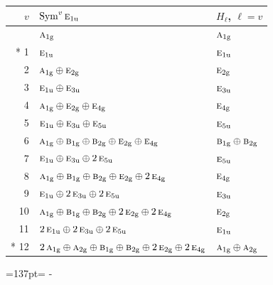\documentclass[10pt,a4paper]{article}
\newcommand{\needspace}[1]{\par\penalty-100\begingroup\dimen0=#1\relax\dimen2=\pagegoal
  \advance\dimen2-\pagetotal\ifdim\dimen0>\dimen2\relax\ifdim\dimen2>0pt\vfil\break\fi\fi
  \endgroup}
\numberwithin{equation}{section}
\newcommand{\irr}[1]{\text{\normalfont\scshape #1}}
\newcommand{\ptag}[1]{\mathrm{#1}}
\begin{document}
{\small\begin{longtable}{@{}rll@{}}\toprule
$v$ & $\operatorname{Sym}^{v}\irr{e}_{1\ptag{u}}$ & $H_\ell$, $\ell = v$\\\midrule\endhead
\bottomrule\endfoot\endlastfoot
0 & $\irr{a}_{1\ptag{g}}$ & $\irr{a}_{1\ptag{g}}$\\*
1 & $\irr{e}_{1\ptag{u}}$ & $\irr{e}_{1\ptag{u}}$\\
2 & $\irr{a}_{1\ptag{g}} \oplus \irr{e}_{2\ptag{g}}$ & $\irr{e}_{2\ptag{g}}$\\
3 & $\irr{e}_{1\ptag{u}} \oplus \irr{e}_{3\ptag{u}}$ & $\irr{e}_{3\ptag{u}}$\\
4 & $\irr{a}_{1\ptag{g}} \oplus \irr{e}_{2\ptag{g}} \oplus \irr{e}_{4\ptag{g}}$ & $\irr{e}_{4\ptag{g}}$\\
5 & $\irr{e}_{1\ptag{u}} \oplus \irr{e}_{3\ptag{u}} \oplus \irr{e}_{5\ptag{u}}$ & $\irr{e}_{5\ptag{u}}$\\
6 & $\irr{a}_{1\ptag{g}} \oplus \irr{b}_{1\ptag{g}} \oplus \irr{b}_{2\ptag{g}} \oplus \irr{e}_{2\ptag{g}} \oplus \irr{e}_{4\ptag{g}}$ & $\irr{b}_{1\ptag{g}} \oplus \irr{b}_{2\ptag{g}}$\\
7 & $\irr{e}_{1\ptag{u}} \oplus \irr{e}_{3\ptag{u}} \oplus 2\,\irr{e}_{5\ptag{u}}$ & $\irr{e}_{5\ptag{u}}$\\
8 & $\irr{a}_{1\ptag{g}} \oplus \irr{b}_{1\ptag{g}} \oplus \irr{b}_{2\ptag{g}} \oplus \irr{e}_{2\ptag{g}} \oplus 2\,\irr{e}_{4\ptag{g}}$ & $\irr{e}_{4\ptag{g}}$\\
9 & $\irr{e}_{1\ptag{u}} \oplus 2\,\irr{e}_{3\ptag{u}} \oplus 2\,\irr{e}_{5\ptag{u}}$ & $\irr{e}_{3\ptag{u}}$\\
10 & $\irr{a}_{1\ptag{g}} \oplus \irr{b}_{1\ptag{g}} \oplus \irr{b}_{2\ptag{g}} \oplus 2\,\irr{e}_{2\ptag{g}} \oplus 2\,\irr{e}_{4\ptag{g}}$ & $\irr{e}_{2\ptag{g}}$\\
11 & $2\,\irr{e}_{1\ptag{u}} \oplus 2\,\irr{e}_{3\ptag{u}} \oplus 2\,\irr{e}_{5\ptag{u}}$ & $\irr{e}_{1\ptag{u}}$\\*
12 & $2\,\irr{a}_{1\ptag{g}} \oplus \irr{a}_{2\ptag{g}} \oplus \irr{b}_{1\ptag{g}} \oplus \irr{b}_{2\ptag{g}} \oplus 2\,\irr{e}_{2\ptag{g}} \oplus 2\,\irr{e}_{4\ptag{g}}$ & $\irr{a}_{1\ptag{g}} \oplus \irr{a}_{2\ptag{g}}$\\
\bottomrule\end{longtable}}
\needspace{137pt}
\end{document}
